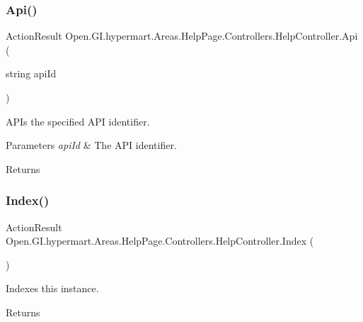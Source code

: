 \subsubsection{\texorpdfstring{Api()}{Api()}}
{\footnotesize\ttfamily Action\+Result Open.\+G\+I.\+hypermart.\+Areas.\+Help\+Page.\+Controllers.\+Help\+Controller.\+Api (\begin{DoxyParamCaption}\item[{string}]{api\+Id }\end{DoxyParamCaption})}



A\+P\+Is the specified A\+PI identifier. 


\begin{DoxyParams}{Parameters}
{\em api\+Id} & The A\+PI identifier.\\
\hline
\end{DoxyParams}
\begin{DoxyReturn}{Returns}

\end{DoxyReturn}
\hypertarget{class_open_1_1_g_i_1_1hypermart_1_1_areas_1_1_help_page_1_1_controllers_1_1_help_controller_a4c63414e59364e8ce99be20a5c909da8}{}\label{class_open_1_1_g_i_1_1hypermart_1_1_areas_1_1_help_page_1_1_controllers_1_1_help_controller_a4c63414e59364e8ce99be20a5c909da8} 
\subsubsection{\texorpdfstring{Index()}{Index()}}
{\footnotesize\ttfamily Action\+Result Open.\+G\+I.\+hypermart.\+Areas.\+Help\+Page.\+Controllers.\+Help\+Controller.\+Index (\begin{DoxyParamCaption}{ }\end{DoxyParamCaption})}



Indexes this instance. 

\begin{DoxyReturn}{Returns}

\end{DoxyReturn}
\hypertarget{class_open_1_1_g_i_1_1hypermart_1_1_areas_1_1_help_page_1_1_controllers_1_1_help_controller_a374c9c2d8d4630c433a397b3ac76c53c}{}\label{class_open_1_1_g_i_1_1hypermart_1_1_areas_1_1_help_page_1_1_controllers_1_1_help_controller_a374c9c2d8d4630c433a397b3ac76c53c} 
